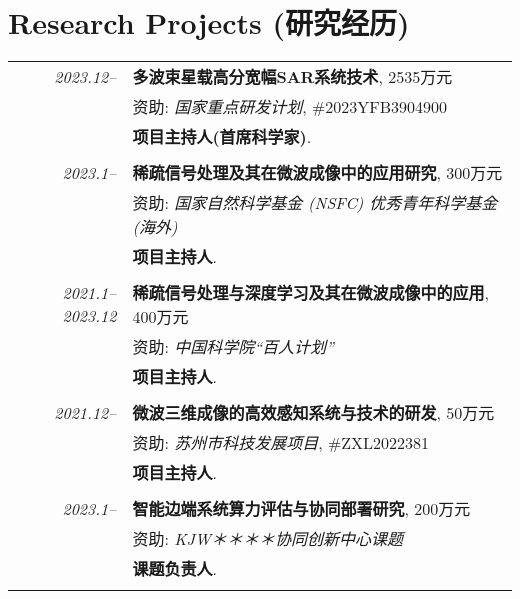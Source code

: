 \documentclass[paper=a4,fontsize=11pt]{scrartcl}
\begin{document}
\section*{Research Projects (研究经历)}

\begin{longtable}{r|p{12cm}}
	
	\emph{2023.12--} & \textbf{多波束星载高分宽幅SAR系统技术}, 2535万元 \\
	& 资助: \emph{国家重点研发计划}, \#2023YFB3904900\\
	& \textbf{项目主持人(首席科学家)}.\\
	\multicolumn{2}{c}{} \\
	
	\emph{2023.1--} & \textbf{稀疏信号处理及其在微波成像中的应用研究}, 300万元 \\
	& 资助: \emph{国家自然科学基金 (NSFC) 优秀青年科学基金 (海外)}\\
	& \textbf{项目主持人}.\\
	\multicolumn{2}{c}{} \\
	
	\emph{2021.1--2023.12} & \textbf{稀疏信号处理与深度学习及其在微波成像中的应用}, 400万元 \\
	& 资助: \emph{中国科学院``百人计划''}\\
	& \textbf{项目主持人}.\\
	\multicolumn{2}{c}{} \\
	
	\emph{2021.12--} & \textbf{微波三维成像的高效感知系统与技术的研发}, 50万元 \\
	& 资助: \emph{苏州市科技发展项目}, \#ZXL2022381\\
	& \textbf{项目主持人}.\\
	\multicolumn{2}{c}{} \\
	
	\emph{2023.1--} & \textbf{智能边端系统算力评估与协同部署研究}, 200万元 \\
	& 资助: \emph{KJW＊＊＊＊协同创新中心课题}\\
	& \textbf{课题负责人}.\\
	\multicolumn{2}{c}{} \\
	

\end{longtable}
\end{document}

